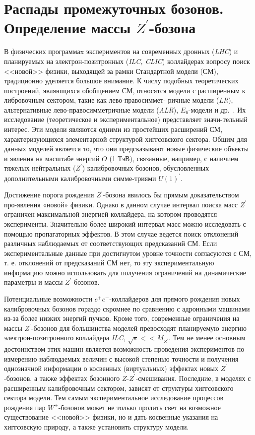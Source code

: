 \section{Распады промежуточных бозонов. Определение массы $Z^\prime$-бозона}

В физических программаx экспериментов на  современных  дронных (\textit{LHC}) и планируемых на  электрон-позитронных (\textit{ILC, CLIC}) коллайдерах вопросу поиск  <<новой>> физики, выходящей за  рамки Стандартной модели (СМ), традиционно уделяется большое внимание. К числу подобных теоретических построений, являющихся обобщением СМ, относятся модели с расширенным к либровочным сектором, такие как лево-правосиммет- 
ричные модели (\textit{LR}), альтернативные лево-правосимметричные модели (\textit{ALR}), $E_6$-модели
и др.~\cite{Bobovnikov:2016}. Их исследование (теоретическое и экспериментальное) представляет значи-тельный интерес. Эти модели являются одними из простейших расширений СМ, характеризующихся элементарной структурой хиггсовского сектора. Общим для данных моделей является то, что они предсказывают новые физические объекты и явления на масштабе энергий $O$ (1 ТэВ), связанные, например, с наличием тяжелых нейтральных ($Z^\prime$) калибровочных бозонов, обусловленных дополнительными калибровочными симме-триями $U(1)^\prime$.

Достижение порога рождения $Z^\prime$-бозона явилось бы прямым доказательством про-явления «новой» физики. Однако в данном случае интервал поиска масс $Z^\prime$ ограничен максимальной энергией коллайдера, на котором проводятся эксперименты. Значительно более широкий интервал масс можно исследовать с помощью пропагаторных эффектов. В этом случае ведется поиск отклонений различных наблюдаемых от соответствующих предсказаний СМ. Если экспериментальные данные при достигнутом уровне точности согласуются с СМ, т. е. отклонений от предсказаний СМ нет, то эту экспериментальную информацию можно использовать для получения ограничений на динамические параметры и массы $Z^\prime$-бозонов.

Потенциальные возможности $e^+$$e^-$-коллайдеров для прямого рождения новых калибровочных бозонов гораздо скромнее по сравнению с адронными машинами из-за более низких энергий пучков. Кроме того, современные ограничения на массы $Z^\prime$-бозонов для большинства моделей превосходят планируемую энергию электрон-позитронного коллайдера \textit{ILC}, $\sqrt{s}<< M_{Z^\prime}$. Тем не менее основным достоинством этих машин является возможность проведения экспериментов по измерению наблюдаемых величин с высокой степенью точности и получения однозначной информации о косвенных (виртуальных) эффектах новых $Z^\prime$-бозонов, а также эффектах бозонного $Z$-$Z^\prime$-смешивания. Последние, в моделях с расширенным калибровочным сектором, зависят от структуры хиггсовского сектора модели. Тем самым экспериментальное исследование процессов рождения пар $W^±$-бозонов может не только пролить свет на возможное существование <<новой>> физики, но и дать косвенные указания на хиггсовскую природу, а также установить структуру модели.

